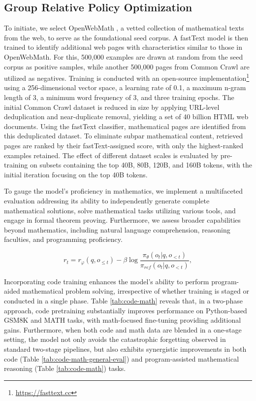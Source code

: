 \begin{itemize}[topsep=0pt]
\begin{itemize}[topsep=0pt]
\subsection{Group Relative Policy Optimization}

To initiate, we select OpenWebMath \citep{openwebmath}, a vetted collection of mathematical texts from the web, to serve as the foundational seed corpus. A fastText model \citep{joulin2016fasttext} is then trained to identify additional web pages with characteristics similar to those in OpenWebMath. For this, 500,000 examples are drawn at random from the seed corpus as positive samples, while another 500,000 pages from Common Crawl are utilized as negatives. Training is conducted with an open-source implementation\footnote{\url{https://fasttext.cc}} using a 256-dimensional vector space, a learning rate of 0.1, a maximum n-gram length of 3, a minimum word frequency of 3, and three training epochs. The initial Common Crawl dataset is reduced in size by applying URL-level deduplication and near-duplicate removal, yielding a set of 40 billion HTML web documents. Using the fastText classifier, mathematical pages are identified from this deduplicated dataset. To eliminate subpar mathematical content, retrieved pages are ranked by their fastText-assigned score, with only the highest-ranked examples retained. The effect of different dataset scales is evaluated by pre-training on subsets containing the top 40B, 80B, 120B, and 160B tokens, with the initial iteration focusing on the top 40B tokens.

To gauge the model's proficiency in mathematics, we implement a multifaceted evaluation addressing its ability to independently generate complete mathematical solutions, solve mathematical tasks utilizing various tools, and engage in formal theorem proving. Furthermore, we assess broader capabilities beyond mathematics, including natural language comprehension, reasoning faculties, and programming proficiency.

\begin{equation}
    r_{t} = r_\varphi(q, o_{\le t}) - \beta \log\frac{\pi_{\theta}(o_{t}|q, o_{<t})}{\pi_{ref}(o_{t}|q, o_{<t})},
\label{eq:PPO-reward}
\end{equation}

Incorporating code training enhances the model's ability to perform program-aided mathematical problem solving, irrespective of whether training is staged or conducted in a single phase. Table \ref{tab:code-math} reveals that, in a two-phase approach, code pretraining substantially improves performance on Python-based GSM8K and MATH tasks, with math-focused fine-tuning providing additional gains. Furthermore, when both code and math data are blended in a one-stage setting, the model not only avoids the catastrophic forgetting observed in standard two-stage pipelines, but also exhibits synergistic improvements in both code (Table \ref{tab:code-math-general-eval}) and program-assisted mathematical reasoning (Table \ref{tab:code-math}) tasks.


\end{itemize}
\end{itemize}
